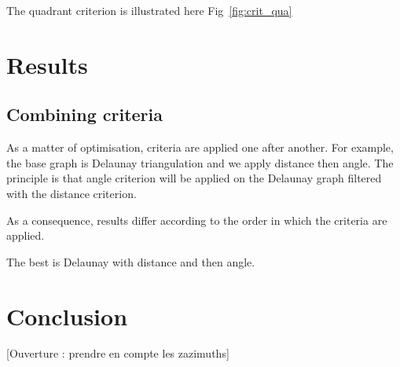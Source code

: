 \documentclass[lettersize,journal,english]{IEEEtran}
\begin{document}
The quadrant criterion is illustrated here Fig~\ref{fig:crit_qua}

\section{Results}

\subsection{Combining criteria}
As a matter of optimisation, criteria are applied one after another. For example, the base graph is Delaunay triangulation and we apply distance then angle.
The principle is that angle criterion will be applied on the Delaunay graph filtered with the distance criterion.

As a consequence, results differ according to the order in which the criteria are applied.

The best is Delaunay with distance and then angle.

\section{Conclusion}

[Ouverture : prendre en compte les zazimuths]

\printglossary[type=\acronymtype]
\printglossary



\end{document}

